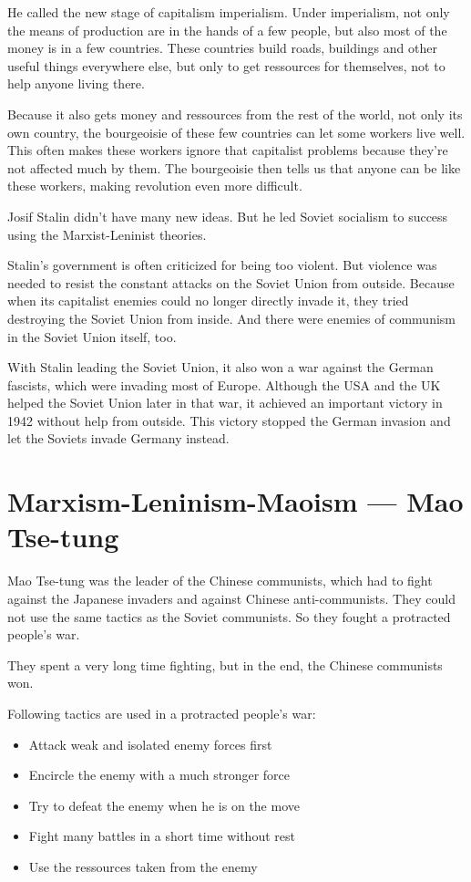 \documentclass[a4paper]{book}%
\begin{document}
He called the new stage of capitalism imperialism. Under imperialism, not only the means of production are in the hands of a few people, but also most of the money is in a few countries. These countries build roads, buildings and other useful things everywhere else, but only to get ressources for themselves, not to help anyone living there.

Because it also gets money and ressources from the rest of the world, not only its own country, the bourgeoisie of these few countries can let some workers live well. This often makes these workers ignore that capitalist problems because they're not affected much by them. The bourgeoisie then tells us that anyone can be like these workers, making revolution even more difficult.

Josif Stalin didn't have many new ideas. But he led Soviet socialism to success using the Marxist-Leninist theories.

Stalin's government is often criticized for being too violent. But violence was needed to resist the constant attacks on the Soviet Union from outside. Because when its capitalist enemies could no longer directly invade it, they tried destroying the Soviet Union from inside. And there were enemies of communism in the Soviet Union itself, too.

With Stalin leading the Soviet Union, it also won a war against the German fascists, which were invading most of Europe. Although the USA and the UK helped the Soviet Union later in that war, it achieved an important victory in 1942 without help from outside. This victory stopped the German invasion and let the Soviets invade Germany instead.

\section{Marxism-Leninism-Maoism --- Mao Tse-tung}

Mao Tse-tung was the leader of the Chinese communists, which had to fight against the Japanese invaders and against Chinese anti-communists. They could not use the same tactics as the Soviet communists. So they fought a protracted people's war.

They spent a very long time fighting, but in the end, the Chinese communists won.

Following tactics are used in a protracted people's war: \\

\begin{itemize}
\item Attack weak and isolated enemy forces first
\item Encircle the enemy with a much stronger force
\item Try to defeat the enemy when he is on the move
\item Fight many battles in a short time without rest
\item Use the ressources taken from the enemy
\end{itemize}
\end{document}
